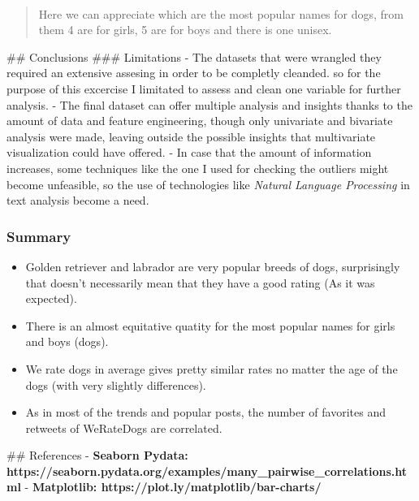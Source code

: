 \documentclass[11pt]{article}
\providecommand{\tightlist}{%
      \setlength{\itemsep}{0pt}\setlength{\parskip}{0pt}}
\begin{document}
    \begin{center}
    \end{center}
    { \hspace*{\fill} \\}
    
    \begin{quote}
Here we can appreciate which are the most popular names for dogs, from
them 4 are for girls, 5 are for boys and there is one unisex.
\end{quote}

     \#\# Conclusions \#\#\# Limitations - The datasets that were wrangled
they required an extensive assesing in order to be completly cleanded.
so for the purpose of this excercise I limitated to assess and clean one
variable for further analysis. - The final dataset can offer multiple
analysis and insights thanks to the amount of data and feature
engineering, though only univariate and bivariate analysis were made,
leaving outside the possible insights that multivariate visualization
could have offered. - In case that the amount of information increases,
some techniques like the one I used for checking the outliers might
become unfeasible, so the use of technologies like \emph{Natural
Language Processing} in text analysis become a need.

    \subsubsection{Summary}\label{summary}

\begin{itemize}
\tightlist
\item
  Golden retriever and labrador are very popular breeds of dogs,
  surprisingly that doesn't necessarily mean that they have a good
  rating (As it was expected).
\item
  There is an almost equitative quatity for the most popular names for
  girls and boys (dogs).
\item
  We rate dogs in average gives pretty similar rates no matter the age
  of the dogs (with very slightly differences).
\item
  As in most of the trends and popular posts, the number of favorites
  and retweets of WeRateDogs are correlated.
\end{itemize}

     \#\# References - \textbf{Seaborn Pydata:
https://seaborn.pydata.org/examples/many\_pairwise\_correlations.html} -
\textbf{Matplotlib: https://plot.ly/matplotlib/bar-charts/}


    
    
    
    
\end{document}
